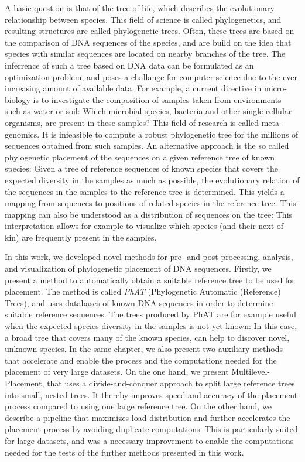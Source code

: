 A basic question is that of the tree of life, which describes the evolutionary relationship between species.
This field of science is called phylogenetics, and resulting structures are called phylogenetic trees.
Often, these trees are based on the comparison of DNA sequences of the species,
and are build on the idea that species with similar sequences are located on nearby branches of the tree.
The inferrence of such a tree based on DNA data can be formulated as an optimization problem,
and poses a challange for computer science due to the ever increasing amount of available data.
For example, a current directive in micro-biology is to investigate the composition of samples
taken from environments such as water or soil:
Which microbial species, bacteria and other single cellular organisms, are present in these samples?
This field of research is called meta-genomics.
It is infeasible to compute a robust phylogenetic tree for the millions of sequences obtained from such samples.
An alternative approach is the so called phylogenetic placement of the sequences on a given reference tree
of known species:
Given a tree of reference sequences of known species that covers the expected diversity in the samples as much as possible,
the evolutionary relation of the sequences in the samples to the reference tree is determined.
This yields a mapping from sequences to positions of related species in the reference tree.
This mapping can also be understood as a distribution of sequences on the tree:
This interpretation allows for example to visualize
which species (and their next of kin) are frequently present in the samples.

In this work, we developed novel methods for pre- and post-processing, analysis, and visualization
of phylogenetic placement of DNA sequences.
Firstly, we present a method to automatically obtain a suitable reference tree to be used for placement.
The method is called \emph{PhAT} (Phylogenetic Automatic (Reference) Trees),
and uses databases of known DNA sequences in order to determine suitable reference sequences.
The trees produced by PhAT are for example useful when the expected species diversity in the samples is not yet known:
In this case, a broad tree that covers many of the known species, can help to discover novel, unknown species.
In the same chapter, we also present two auxiliary methods that accelerate and enable the process and the computations
needed for the placement of very large datasets.
On the one hand, we present Multilevel-Placement, that uses a divide-and-conquer approach to split large reference trees
into small, nested trees.
It thereby improves speed and accuracy of the placement process compared to using one large reference tree.
On the other hand, we describe a pipeline that maximizes load distribution and further accelerates the placement process
by avoiding duplicate computations.
This is particularly suited for large datasets, and was a necessary improvement to enable the computations needed
for the tests of the further methods presented in this work.

